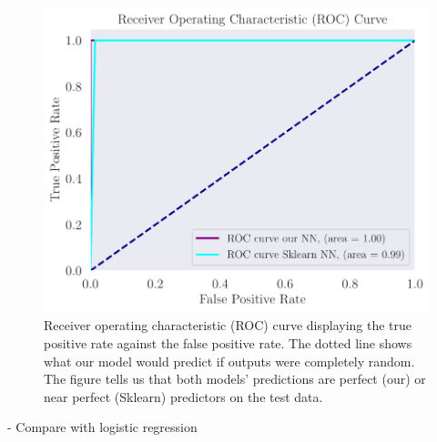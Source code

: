 \begin{figure}
    \centering
    \includegraphics[width=0.99\linewidth]{latex/figures/ADAM_AUCROC_ADAM_relu6-100_sigmoid-2.pdf}
    \caption{Receiver operating characteristic (ROC) curve displaying the true positive rate against the false positive rate. The dotted line shows what our model would predict if outputs were completely random. The figure tells us that both models' predictions are perfect (our) or near perfect (Sklearn) predictors on the test data.}
    \label{fig:roc}
\end{figure}

- Compare with logistic regression\\

